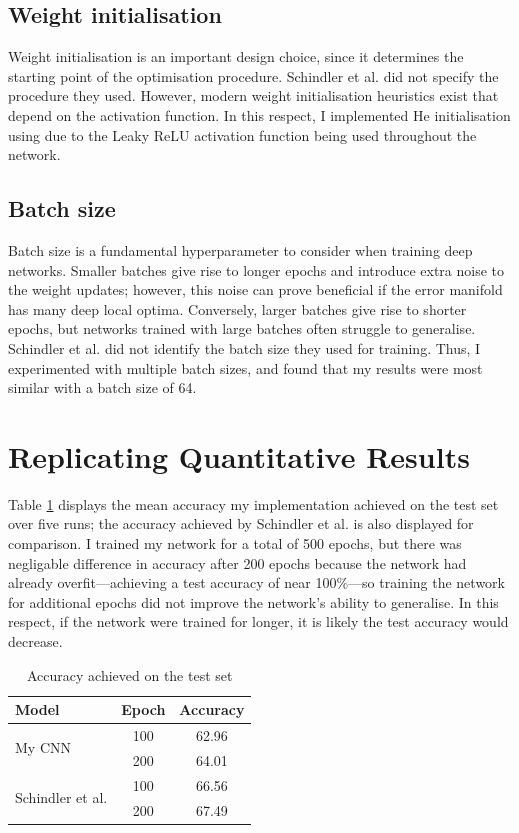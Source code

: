 \documentclass[conference]{IEEEtran}
\begin{document}
\subsection{Weight initialisation}

Weight initialisation is an important design choice, since it determines the starting point of the optimisation procedure.
Schindler et al. did not specify the procedure they used.
However, modern weight initialisation heuristics exist that depend on the activation function.
In this respect, I implemented He initialisation using due to the Leaky ReLU activation function being used throughout the network.

\subsection{Batch size}

Batch size is a fundamental hyperparameter to consider when training deep networks.
Smaller batches give rise to longer epochs and introduce extra noise to the weight updates; however, this noise can prove beneficial if the error manifold has many deep local optima.
Conversely, larger batches give rise to shorter epochs, but networks trained with large batches often struggle to generalise.
Schindler et al. did not identify the batch size they used for training.
Thus, I experimented with multiple batch sizes, and found that my results were most similar with a batch size of 64.

\section{Replicating Quantitative Results}

Table \ref{shallow_results} displays the mean accuracy my implementation achieved on the test set over five runs; the accuracy achieved by Schindler et al. \cite{SchindlerLidyRauber} is also displayed for comparison.
I trained my network for a total of 500 epochs, but there was negligable difference in accuracy after 200 epochs because the network had already overfit---achieving a test accuracy of near 100\%---so training the network for additional epochs did not improve the network's ability to generalise.
In this respect, if the network were trained for longer, it is likely the test accuracy would decrease.

\begin{table}[htbp]
    \caption{Accuracy achieved on the test set}
    \begin{center}
    \begin{tabular}{l c c}
    \toprule
    \textbf{Model}&\textbf{Epoch}&\textbf{Accuracy}\\
    \midrule
    \multirow{ 2}{*}{My CNN} & 100 & 62.96 \\
    & 200 & 64.01 \\
    \midrule
    \multirow{ 2}{*}{Schindler et al.} & 100 & 66.56\\
    & 200 & 67.49 \\
    \bottomrule
    \end{tabular}
    \label{shallow_results}
    \end{center}
\end{table}
\end{document}
